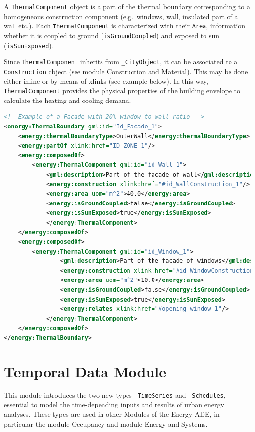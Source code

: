 \documentclass[a4paper,12pt]{article}
\let\stdsection\section%
\renewcommand\section{\newpage\stdsection}
\begin{document}
A \lstinline!ThermalComponent! object is a part of the thermal boundary
corresponding to a homogeneous construction component (e.g.~windows,
wall, insulated part of a wall etc.). Each \lstinline!ThermalComponent!
is characterized with their \lstinline!Area!, information whether it is
coupled to ground (\lstinline!isGroundCoupled!) and exposed to sun
(\lstinline!isSunExposed!).

Since \lstinline!ThermalComponent! inherits from
\lstinline!_CityObject!, it can be associated to a
\lstinline!Construction! object (see module Construction and Material).
This may be done either inline or by means of xlinks (see example
below). In this way, \lstinline!ThermalComponent! provides the physical
properties of the building envelope to calculate the heating and cooling
demand.

\begin{lstlisting}[language=XML]
<!--Example of a Facade with 20% window to wall ratio -->
<energy:ThermalBoundary gml:id="Id_Facade_1">
    <energy:thermalBoundaryType>OuterWall</energy:thermalBoundaryType>
    <energy:partOf xlink:href="ID_ZONE_1"/>
    <energy:composedOf>
        <energy:ThermalComponent gml:id="id_Wall_1">
            <gml:description>Part of the facade of wall</gml:description>
            <energy:construction xlink:href="#id_WallConstruction_1"/>
            <energy:area uom="m^2">40.0</energy:area>
            <energy:isGroundCoupled>false</energy:isGroundCoupled>
            <energy:isSunExposed>true</energy:isSunExposed>
            </energy:ThermalComponent>
    </energy:composedOf>
    <energy:composedOf>
        <energy:ThermalComponent gml:id="id_Window_1">
                <gml:description>Part of the facade of windows</gml:description>
                <energy:construction xlink:href="#id_WindowConstruction_1"/>
                <energy:area uom="m^2">10.0</energy:area>
                <energy:isGroundCoupled>false</energy:isGroundCoupled>
                <energy:isSunExposed>true</energy:isSunExposed>
                <energy:relates xlink:href="#opening_window_1"/>
            </energy:ThermalComponent>
    </energy:composedOf>                
</energy:ThermalBoundary>
\end{lstlisting}

\section{Temporal Data Module}\label{temporal-data-module}

This module introduces the two new types \lstinline!_TimeSeries! and
\lstinline!_Schedules!, essential to model the time-depending inputs and
results of urban energy analyses. These types are used in other Modules
of the Energy ADE, in particular the module Occupancy and module Energy
and Systems.
\end{document}
